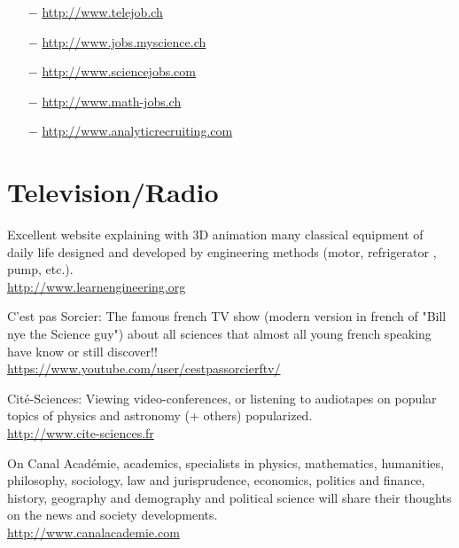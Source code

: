 	\begin{itemize}	 
		\item[$-$] \href{http://www.telejob.ch}{\color{blue}http://www.telejob.ch} 
	
		\item[$-$] \href{http://www.jobs.myscience.ch}{\color{blue}http://www.jobs.myscience.ch} 
	
		\item[$-$] \href{http://www.sciencejobs.com}{\color{blue}http://www.sciencejobs.com}
	
		\item[$-$] \href{http://www.math-jobs.ch}{\color{blue}http://www.math-jobs.ch}
	
		\item[$-$] \href{http://www.analyticrecruiting.com}{\color{blue}http://www.analyticrecruiting.com}
	\end{itemize}
	
	\section{Television/Radio}

	{\Large {}} Excellent website explaining with 3D animation many classical equipment of daily life designed and developed by engineering methods (motor, refrigerator , pump, etc.).\\
	\href{http://www.learnengineering.org}{\color{blue}http://www.learnengineering.org}
	
	\bcdfrance{} C'est pas Sorcier: The famous french TV show (modern version in french of "Bill nye the Science guy") about all sciences that almost all young french speaking have know or still discover!!\\
	\href{https://www.youtube.com/user/cestpassorcierftv/}{\color{blue}https://www.youtube.com/user/cestpassorcierftv/}
	
	\bcdfrance{} Cité-Sciences: Viewing video-conferences, or listening to audiotapes on popular topics of physics and astronomy (+ others) popularized.\\
	\href{http://www.cite-sciences.fr}{\color{blue}http://www.cite-sciences.fr}
	
	\bcdfrance{} On Canal Académie, academics, specialists in physics, mathematics, humanities, philosophy, sociology, law and jurisprudence, economics, politics and finance, history, geography and demography and political science will share their thoughts on the news and society developments.\\
	\href{http://www.canalacademie.com}{\color{blue}http://www.canalacademie.com}


